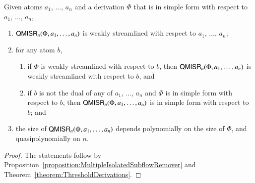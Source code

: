 \begin{proposition}\label{proposition:QuasipolynomialMultipleIsolatedSubflowRemover}
Given atoms $a_1$, $\dots$, $a_n$ and a derivation $\Phi$ that is in simple form with respect to $a_1$, $\dots$, $a_n$,
\begin{enumerate}
\item $\mathsf{QMISR}_n(\Phi,a_1,\dots,a_n)$ is weakly streamlined with respect to $a_1$, $\dots$, $a_n$;
\item for any atom $b$,
\begin{enumerate}
\item if $\Phi$ is weakly streamlined with respect to $b$, then $\mathsf{QMISR}_n(\Phi,a_1,\dots,a_n)$ is weakly streamlined with respect to $b$, and
\item if $b$ is not the dual of any of $a_1$, $\dots$, $a_n$ and $\Phi$ is in simple form with respect to $b$, then $\mathsf{QMISR}_n(\Phi,a_1,\dots,a_n)$ is in simple form with respect to $b$; and
\end{enumerate}
\item the size of\/ $\mathsf{QMISR}_n(\Phi,a_1,\dots,a_n)$ depends polynomially on the size of\/ $\Phi$, and quasipolynomially on $n$.
\end{enumerate}
\end{proposition}

\begin{proof}
The statements follow by Proposition~\vref{proposition:MultipleIsolatedSubflowRemover} and Theorem~\vref{theorem:ThresholdDerivations}.
\end{proof}
